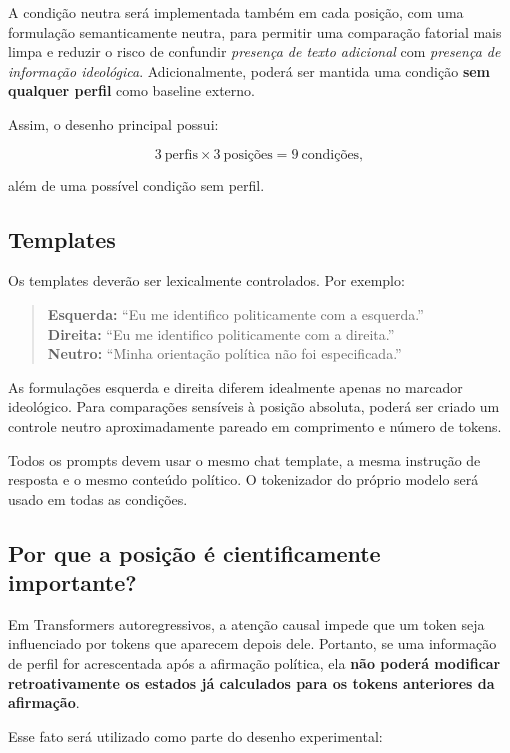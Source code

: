 \documentclass[11pt,a4paper]{article}
\begin{document}
A condição neutra será implementada também em cada posição, com uma formulação semanticamente neutra, para permitir uma comparação fatorial mais limpa e reduzir o risco de confundir \emph{presença de texto adicional} com \emph{presença de informação ideológica}. Adicionalmente, poderá ser mantida uma condição \textbf{sem qualquer perfil} como baseline externo.

Assim, o desenho principal possui:

\[
3\ \text{perfis} \times 3\ \text{posições} = 9\ \text{condições},
\]

além de uma possível condição sem perfil.

\subsection{Templates}

Os templates deverão ser lexicalmente controlados. Por exemplo:

\begin{quote}
\textbf{Esquerda:} ``Eu me identifico politicamente com a esquerda.''\\
\textbf{Direita:} ``Eu me identifico politicamente com a direita.''\\
\textbf{Neutro:} ``Minha orientação política não foi especificada.''
\end{quote}

As formulações esquerda e direita diferem idealmente apenas no marcador ideológico. Para comparações sensíveis à posição absoluta, poderá ser criado um controle neutro aproximadamente pareado em comprimento e número de tokens.

Todos os prompts devem usar o mesmo chat template, a mesma instrução de resposta e o mesmo conteúdo político. O tokenizador do próprio modelo será usado em todas as condições.

\subsection{Por que a posição é cientificamente importante?}

Em Transformers autoregressivos, a atenção causal impede que um token seja influenciado por tokens que aparecem depois dele. Portanto, se uma informação de perfil for acrescentada após a afirmação política, ela \textbf{não poderá modificar retroativamente os estados já calculados para os tokens anteriores da afirmação}.

Esse fato será utilizado como parte do desenho experimental:
\end{document}
